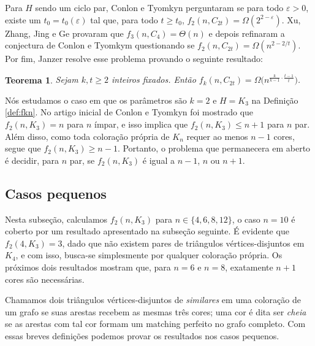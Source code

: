 \documentclass[11pt,twoside,a4paper]{book}
\let\eps=\varepsilon
\newtheorem{teorema}{Teorema}[section]
\theoremstyle{note}
\begin{document}
Para $H$ sendo um ciclo par, Conlon e Tyomkyn \cite{conlontyomkyn} perguntaram se para todo $\eps >0$,
existe um $t_0 = t_0(\eps)$ tal que, para todo 
$t \geq t_0$, $f_2(n, C_{2t}) = \Omega(2^{2-\eps})$.
%
Xu, Zhang, Jing e Ge \cite{ge2020color} provaram que $f_3(n, C_4) = \Theta(n)$ e depois refinaram a conjectura de Conlon e Tyomkym questionando se
$f_2(n, C_{2t}) = \Omega(n^{2-2/t})$. 
Por fim, Janzer \cite{janzer2020rainbow} resolve esse problema provando o seguinte resultado:
 
    \begin{teorema}\label{teo:janzer-ciclos}\cite{janzer2020rainbow}
           Sejam $k,t \geq 2$ inteiros fixados. Então $f_k(n,C_{2t}) = \Omega\big(n^{\frac{k}{k-1} \cdot\frac{t-1}{t}}\big)$.
    \end{teorema}

Nós estudamos o caso em que os parâmetros são $k = 2$ e $H = K_3$ na Definição \ref{def:fkn}. 
No artigo inicial de Conlon e Tyomkyn foi mostrado que $f_2(n,K_3) = n$ para
$n$ ímpar, e isso implica que $f_2(n,K_3) \leq n + 1$ para $n$ par. 
Além disso, como toda coloração própria de $K_n$ requer ao menos $n-1$ cores, segue que $f_2(n,K_3) \geq n- 1$.
Portanto, o problema que permanecera em aberto é decidir, para $n$ par, se $f_2(n,K_3)$ é igual a $n-1$, $n$ ou $n + 1$.

\subsection{Casos pequenos}

Nesta subseção, calculamos $f_2(n,K_3)$ para $n \in \{4,6,8,12\}$, o caso $n=10$ é coberto por um resultado apresentado na subseção seguinte. 
É evidente que $f_2(4,K_3) = 3$, dado que não existem pares de triângulos vértices-disjuntos em $K_4$, e com isso, busca-se simplesmente por qualquer coloração própria. 
Os próximos dois resultados mostram que, para $n = 6$ e $n = 8$, exatamente $n + 1$ cores são necessárias.

Chamamos dois triângulos vértices-disjuntos de \textit{similares} em uma coloração de um grafo se suas arestas recebem as mesmas três cores;  uma cor é dita ser \textit{cheia} se as arestas com tal cor formam um matching perfeito no grafo completo. 
Com essas breves definições podemos provar os resultados nos casos pequenos.
\end{document}
